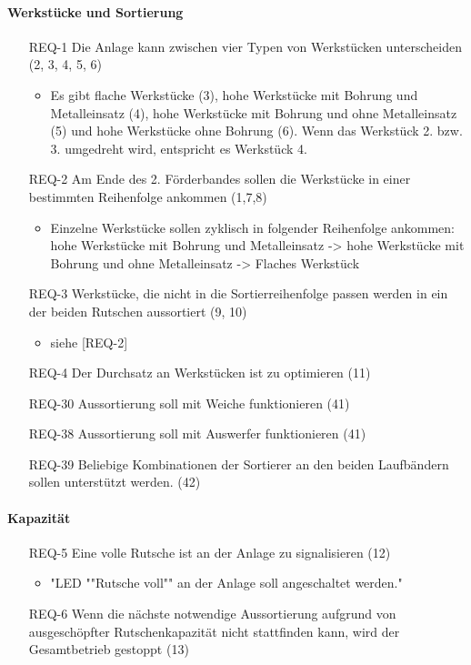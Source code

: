 \paragraph{Werkstücke und Sortierung}
\begin{itemize}
    \item[REQ-1] Die Anlage kann zwischen vier Typen von Werkstücken unterscheiden (2, 3, 4, 5, 6)
    \begin{itemize}
        \item Es gibt flache Werkstücke (3), hohe Werkstücke mit Bohrung und Metalleinsatz (4), hohe Werkstücke mit Bohrung und ohne Metalleinsatz (5) und hohe Werkstücke ohne Bohrung (6). Wenn das Werkstück 2. bzw. 3. umgedreht wird, entspricht es Werkstück 4.
    \end{itemize}
    \item[REQ-2] Am Ende des 2. Förderbandes sollen die Werkstücke in einer bestimmten Reihenfolge ankommen (1,7,8)
    \begin{itemize}
        \item Einzelne Werkstücke sollen zyklisch in folgender Reihenfolge ankommen: hohe Werkstücke mit Bohrung und Metalleinsatz -> hohe Werkstücke mit Bohrung und ohne Metalleinsatz -> Flaches Werkstück
    \end{itemize}
    \item[REQ-3] Werkstücke, die nicht in die Sortierreihenfolge passen werden in ein der beiden Rutschen aussortiert (9, 10)
    \begin{itemize}
        \item siehe [REQ-2]
    \end{itemize}
    \item[REQ-4] Der Durchsatz an Werkstücken ist zu optimieren (11)
    \item[REQ-30] Aussortierung soll mit Weiche funktionieren (41)
    \item[REQ-38] Aussortierung soll mit Auswerfer funktionieren (41)
    \item[REQ-39] Beliebige Kombinationen der Sortierer an den beiden Laufbändern sollen unterstützt werden. (42)
\end{itemize}

\paragraph{Kapazität}
\begin{itemize}
    \item[REQ-5] Eine volle Rutsche ist an der Anlage zu signalisieren (12)
    \begin{itemize}
        \item "LED ""Rutsche voll"" an der Anlage soll angeschaltet werden."
    \end{itemize}
    \item[REQ-6] Wenn die nächste notwendige Aussortierung aufgrund von ausgeschöpfter Rutschenkapazität nicht stattfinden kann, wird der Gesamtbetrieb gestoppt (13)
\end{itemize}

